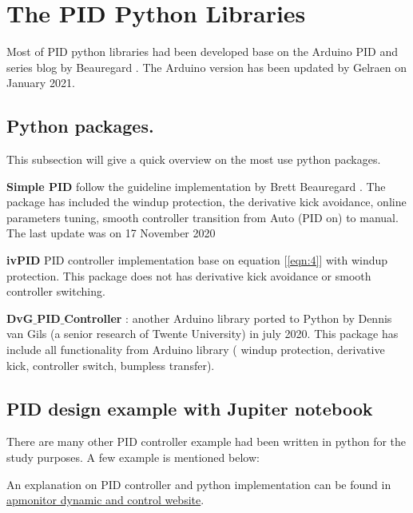 \section{The PID Python Libraries}

Most of PID python libraries had been developed base on the Arduino PID and series blog by Beauregard \cite{Arduino_PID}  \cite{Improving_PID}. The Arduino version has been updated by 
Gelraen \cite{Arduino_PID_V2} on January 2021.

\subsection{Python packages.}
This subsection will give a quick overview on the most use python packages.

\textbf{Simple PID} \cite{Simple_Pid} follow the guideline implementation by Brett Beauregard  \cite{Improving_PID}. The package has included the windup protection, the derivative kick avoidance, online parameters tuning, smooth controller transition from Auto (PID on) to manual. The last update was on 17 November 2020

\textbf{ivPID} \cite{ivPID} PID controller implementation base on equation [\ref{eqn:4}] with windup protection. This package does not has derivative kick avoidance or smooth controller switching.

\textbf{DvG${\_}$PID${\_}$Controller} \cite{DvG_PID_Controller}: another Arduino library \cite{Arduino_PID} ported to Python by Dennis van Gils (a senior research of Twente University) in july 2020. This package has include all functionality from Arduino library ( windup protection, derivative kick, controller switch, bumpless transfer).

\subsection{PID design example with Jupiter notebook}

There are many other PID controller example had been written in python for the study purposes. A few example is mentioned below:

An explanation on PID controller and python implementation can be found in \href{https://apmonitor.com/pdc/index.php/Main/ProportionalIntegralDerivative}{apmonitor dynamic and control website}.

